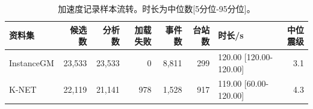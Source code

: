 \begin{table}[!htbp]
\centering
\caption{加速度记录样本流转。时长为中位数[5分位-95分位]。}
\label{tab:dataset}
\begin{singlespace}
\footnotesize
\setlength{\tabcolsep}{3pt}
\begin{tabular*}{\textwidth}{@{\extracolsep{\fill}}lrrrrrlr@{}}
\toprule
资料集 & 候选数 & 分析数 & 加载失败 & 事件数 & 台站数 & 时长/s & 中位震级 \\
\midrule
InstanceGM & 23,533 & 23,533 & 0 & 8,811 & 299 & 120.00 [120.00-120.00] & 3.1 \\
K-NET & 22,119 & 21,141 & 978 & 1,528 & 917 & 119.00 [60.00-120.00] & 4.3 \\
\bottomrule
\end{tabular*}
\end{singlespace}
\end{table}
